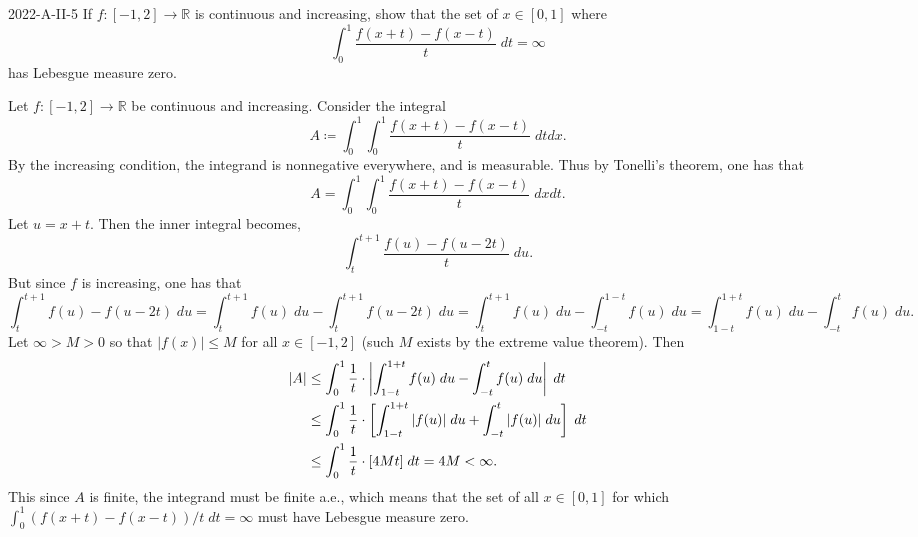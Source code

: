 \documentclass{article}
\begin{document}
	\begin{prb}{2022-A-II-5}
		If $f: [-1,2] \to \mathbb{R}$ is continuous and increasing, show that the set of $x \in [0,1]$ where 
		\begin{equation*}
			\int_{0}^{1}\frac{f(x + t) - f(x - t)}{t}\;dt = \infty 
		\end{equation*}
		has Lebesgue measure zero. 
	\end{prb}
	Let $f: [-1,2] \to \mathbb{R}$ be continuous and increasing. Consider the integral 
	\begin{equation*}
		A \coloneqq \int_{0}^{1}\int_{0}^{1}\frac{f(x + t) - f(x - t)}{t}\;dt dx. 
	\end{equation*}
	By the increasing condition, the integrand is nonnegative everywhere, and is measurable. Thus by Tonelli's theorem, one has that 
	\begin{equation*}
		A = \int_{0}^{1}\int_{0}^{1}\frac{f(x + t) - f(x - t)}{t}\;dx dt. 
	\end{equation*}
	Let $u = x + t$. Then the inner integral becomes, 
	\begin{equation*}
		\int_{t}^{t + 1}\frac{f(u) - f(u - 2t)}{t}\;du. 
	\end{equation*}
	But since $f$ is increasing, one has that 
	\begin{equation*}
		\int_{t}^{t + 1}f(u) - f(u - 2t)\;du = \int_{t}^{t + 1}f(u)\;du - \int_{t}^{t + 1}f(u - 2t)\;du = \int_{t}^{t + 1}f(u)\;du - \int_{-t}^{1 - t}f(u)\;du = \int_{1 - t}^{1 + t}f(u)\;du - \int_{-t}^{t}f(u)\;du. 
	\end{equation*}
	Let $\infty > M > 0$ so that $|f(x)| \leq M$ for all $x \in [-1,2]$ (such $M$ exists by the extreme value theorem). Then 
	\begin{align*}
		\begin{split}
		|A| &\leq \int_{0}^{1}\frac{1}{t}\cdot \left| \int_{1 - t}^{1 + t}f(u)\;du - \int_{-t}^{t}f(u)\;du \right|\;dt \\
		&\leq \int_{0}^{1}\frac{1}{t}\cdot \left[\int_{1 - t}^{1 + t}|f(u)|\;du + \int_{-t}^{t}|f(u)|\;du\right]\;dt \\
		&\leq \int_{0}^{1}\frac{1}{t}\cdot[4Mt]\;dt = 4M < \infty. 
	\end{split}
	\end{align*}
	This since $A$ is finite, the integrand must be finite a.e., which means that the set of all $x \in [0,1]$ for which $\int_{0}^{1}(f(x + t) - f(x - t))/t\;dt = \infty$ must have Lebesgue measure zero. 
	
\end{document}
